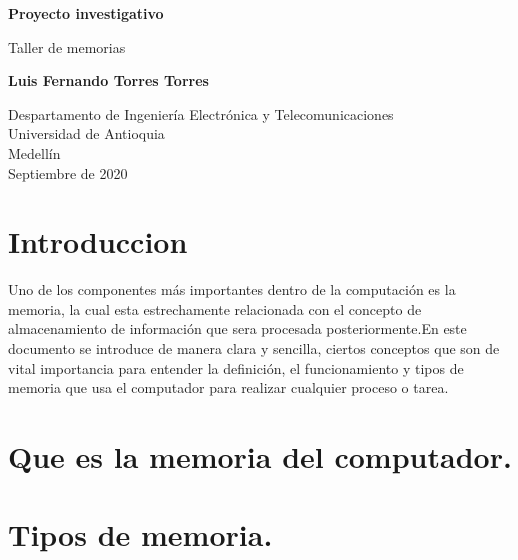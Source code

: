 \documentclass{article}
\begin{document}
\begin{titlepage}
    \begin{center}
        \vspace*{1cm}
            
        \Huge
        \textbf{Proyecto investigativo}
        
            
        \vspace{0.5cm}
        \LARGE
        Taller de memorias
            
        \vspace{1.5cm}
            
        \textbf{Luis Fernando Torres Torres}
            
        \vfill
            
        \vspace{0.8cm}
            
        \Large
        Despartamento de Ingeniería Electrónica y Telecomunicaciones\\
        Universidad de Antioquia\\
        Medellín\\
        Septiembre de 2020
            
    \end{center}
\end{titlepage}

\tableofcontents

\newpage

\section{Introduccion}\label{intro}
Uno de los componentes más importantes dentro de la computación es la memoria, la cual esta estrechamente relacionada con el concepto de almacenamiento de información que sera procesada posteriormente.En este documento se introduce de manera clara y sencilla, ciertos conceptos que son de vital importancia para entender la definición, el funcionamiento y tipos de memoria que usa el computador para realizar cualquier proceso o tarea.

\section{Que es la memoria del computador.} \label{contenido}

\section{Tipos de memoria.} \label{contenido}%
\end{document}
